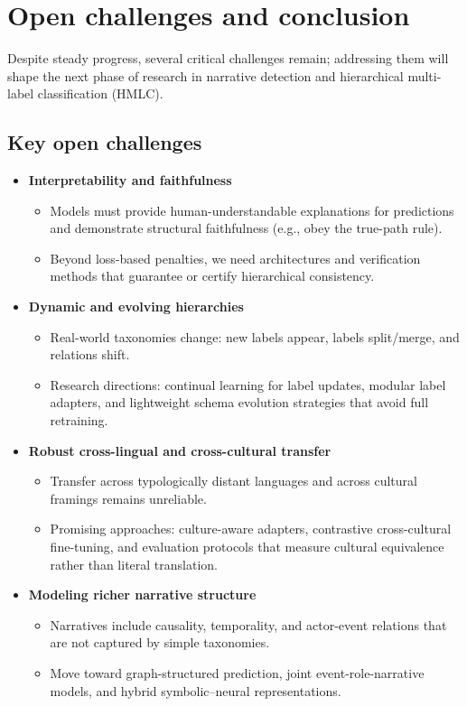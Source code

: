 \chapter{Open challenges and conclusion}

Despite steady progress, several critical challenges remain; addressing them will shape the next phase of research in narrative detection and hierarchical multi-label classification (HMLC).

\section{Key open challenges}

\begin{itemize}
	\item \textbf{Interpretability and faithfulness}
		\begin{itemize}
			\item Models must provide human-understandable explanations for predictions and demonstrate structural faithfulness (e.g., obey the true-path rule).
			\item Beyond loss-based penalties, we need architectures and verification methods that guarantee or certify hierarchical consistency.
		\end{itemize}

	\item \textbf{Dynamic and evolving hierarchies}
		\begin{itemize}
			\item Real-world taxonomies change: new labels appear, labels split/merge, and relations shift.
			\item Research directions: continual learning for label updates, modular label adapters, and lightweight schema evolution strategies that avoid full retraining.
		\end{itemize}

	\item \textbf{Robust cross-lingual and cross-cultural transfer}
		\begin{itemize}
			\item Transfer across typologically distant languages and across cultural framings remains unreliable.
			\item Promising approaches: culture-aware adapters, contrastive cross-cultural fine-tuning, and evaluation protocols that measure cultural equivalence rather than literal translation.
		\end{itemize}

	\item \textbf{Modeling richer narrative structure}
		\begin{itemize}
			\item Narratives include causality, temporality, and actor-event relations that are not captured by simple taxonomies.
			\item Move toward graph-structured prediction, joint event-role-narrative models, and hybrid symbolic–neural representations.
		\end{itemize}


\end{itemize}
